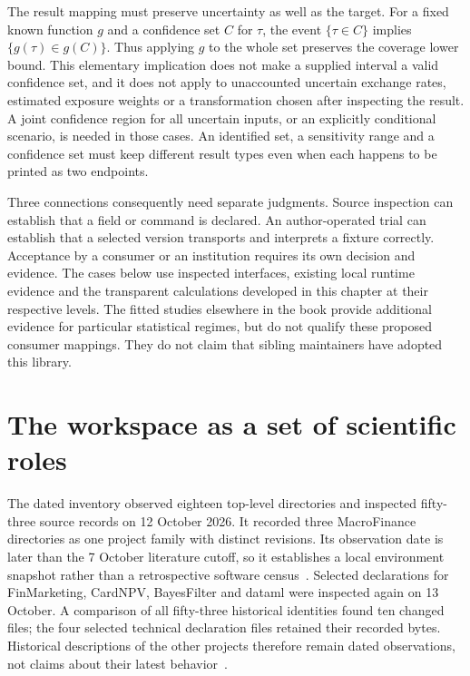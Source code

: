 The result mapping must preserve uncertainty as well as the target. For a
fixed known function $g$ and a confidence set $C$ for $\tau$, the event
$\{\tau\in C\}$ implies $\{g(\tau)\in g(C)\}$. Thus applying $g$ to the
whole set preserves the coverage lower bound. This elementary implication
does not make a supplied interval a valid confidence set, and it does not
apply to unaccounted uncertain exchange rates, estimated exposure weights or
a transformation chosen after inspecting the result. A joint confidence
region for all uncertain inputs, or an explicitly conditional scenario, is
needed in those cases. An identified set, a sensitivity range and a confidence
set must keep different result types even when each happens to be printed as
two endpoints.

Three connections consequently need separate judgments. Source inspection can
establish that a field or command is declared. An author-operated trial can
establish that a selected version transports and interprets a fixture
correctly. Acceptance by a consumer or an institution requires its own
decision and evidence. The cases below use inspected interfaces, existing
local runtime evidence and the transparent calculations developed in this chapter at their respective levels. The fitted studies elsewhere in the book provide additional evidence for particular statistical regimes, but do not qualify these proposed consumer mappings. They do not claim that sibling maintainers have adopted this library.

\section{The workspace as a set of scientific roles}

The dated inventory observed eighteen top-level directories and inspected
fifty-three source records on 12 October 2026. It recorded three MacroFinance
directories as one project family with distinct revisions. Its observation
date is later than the 7 October literature cutoff, so it establishes a local
environment snapshot rather than a retrospective software census~\citep{v12_in_inventory}. Selected declarations for FinMarketing, CardNPV,
BayesFilter and dataml were inspected again on 13 October. A comparison of all
fifty-three historical identities found ten changed files; the four selected
technical declaration files retained their recorded bytes. Historical
descriptions of the other projects therefore remain dated observations, not
claims about their latest behavior~\citep{exec13_i3_inspection}.

